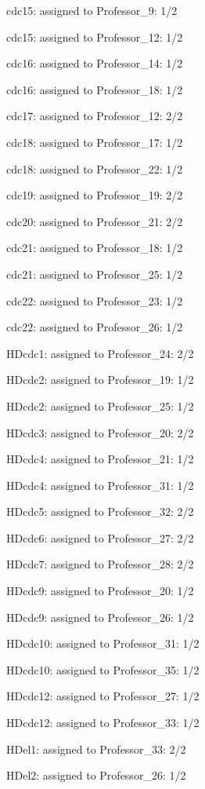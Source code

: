 \documentclass{article} %
\begin{document}
\noindent cdc15: assigned to Professor\_9: 1/2

\noindent cdc15: assigned to Professor\_12: 1/2

\noindent cdc16: assigned to Professor\_14: 1/2

\noindent cdc16: assigned to Professor\_18: 1/2

\noindent cdc17: assigned to Professor\_12: 2/2

\noindent cdc18: assigned to Professor\_17: 1/2

\noindent cdc18: assigned to Professor\_22: 1/2

\noindent cdc19: assigned to Professor\_19: 2/2

\noindent cdc20: assigned to Professor\_21: 2/2

\noindent cdc21: assigned to Professor\_18: 1/2

\noindent cdc21: assigned to Professor\_25: 1/2

\noindent cdc22: assigned to Professor\_23: 1/2

\noindent cdc22: assigned to Professor\_26: 1/2

\noindent HDcdc1: assigned to Professor\_24: 2/2

\noindent HDcdc2: assigned to Professor\_19: 1/2

\noindent HDcdc2: assigned to Professor\_25: 1/2

\noindent HDcdc3: assigned to Professor\_20: 2/2

\noindent HDcdc4: assigned to Professor\_21: 1/2

\noindent HDcdc4: assigned to Professor\_31: 1/2

\noindent HDcdc5: assigned to Professor\_32: 2/2

\noindent HDcdc6: assigned to Professor\_27: 2/2

\noindent HDcdc7: assigned to Professor\_28: 2/2

\noindent HDcdc9: assigned to Professor\_20: 1/2

\noindent HDcdc9: assigned to Professor\_26: 1/2

\noindent HDcdc10: assigned to Professor\_31: 1/2

\noindent HDcdc10: assigned to Professor\_35: 1/2

\noindent HDcdc12: assigned to Professor\_27: 1/2

\noindent HDcdc12: assigned to Professor\_33: 1/2

\noindent HDel1: assigned to Professor\_33: 2/2

\noindent HDel2: assigned to Professor\_26: 1/2
\end{document}

